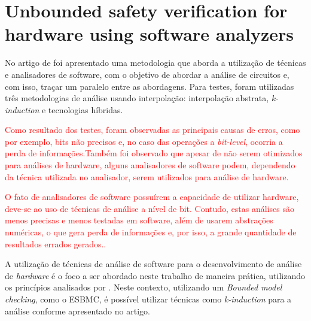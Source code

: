 \section{Unbounded safety verification for hardware using software analyzers}
No artigo de \citeauthor{mukherjee2016unbounded} foi apresentado uma metodologia que aborda a utilização de técnicas e analisadores de software, com o objetivo de abordar a análise de circuitos e, com isso, traçar um paralelo entre as abordagens. Para testes, foram utilizadas três metodologias de análise usando interpolação:\cite{beyer2011cpachecker} interpolação abstrata\cite{blanchet2003static}, \textit{k-induction}\cite{donaldson2011software} e tecnologias híbridas. 

\par
\textcolor{red}{Como resultado dos testes, foram observadas as principais causas de erros, como por exemplo, bits não precisos e, no caso das operações a \textit{bit-level}, ocorria a perda de informações.Também foi observado que apesar de não serem otimizados para análises de hardware, alguns analisadores de software podem, dependendo da técnica utilizada no analisador, serem utilizados para análise de hardware\cite{mukherjee2016unbounded}.}

\par
\textcolor{red}{O fato de analisadores de software possuírem a capacidade de utilizar hardware, deve-se ao uso de técnicas de análise a nível de bit. Contudo, estas análises são menos precisas e menos testadas em software, além de usarem abstrações numéricas, o que gera perda de informações e, por isso, a grande quantidade de resultados errados gerados.\cite{mukherjee2016unbounded}.}

\par
A utilização de técnicas de análise de software para o desenvolvimento de análise de \textit{hardware} é o foco a ser abordado neste trabalho de maneira prática, utilizando os princípios analisados por \cite{mukherjee2016unbounded}. Neste contexto, utilizando um \textit{Bounded model checking}, como o ESBMC, é possível utilizar técnicas como \textit{k-induction} para a análise conforme apresentado no artigo.

